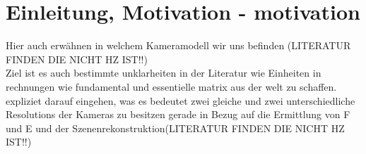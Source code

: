\chapter{Einleitung, Motivation - motivation}

Hier auch erwähnen in welchem Kameramodell wir uns befinden (LITERATUR FINDEN DIE NICHT HZ IST!!)\\

Ziel ist es auch bestimmte unklarheiten in der Literatur wie Einheiten in rechnungen wie fundamental und essentielle matrix aus der welt zu schaffen.\\

expliziet darauf eingehen, was es bedeutet zwei gleiche und zwei unterschiedliche Resolutions der Kameras zu besitzen gerade in Bezug auf die Ermittlung von F und E und der Szenenrekonstruktion(LITERATUR FINDEN DIE NICHT HZ IST!!)